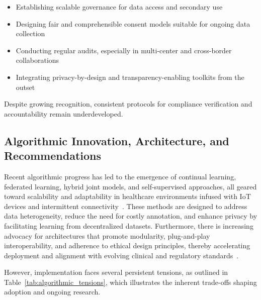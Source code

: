 \documentclass[sigconf]{acmart}
\begin{document}
\begin{itemize}
    \item Establishing scalable governance for data access and secondary use
    \item Designing fair and comprehensible consent models suitable for ongoing data collection
    \item Conducting regular audits, especially in multi-center and cross-border collaborations
    \item Integrating privacy-by-design and transparency-enabling toolkits from the outset
\end{itemize}

Despite growing recognition, consistent protocols for compliance verification and accountability remain underdeveloped.

\subsection{Algorithmic Innovation, Architecture, and Recommendations}

Recent algorithmic progress has led to the emergence of continual learning, federated learning, hybrid joint models, and self-supervised approaches, all geared toward scalability and adaptability in healthcare environments infused with IoT devices and intermittent connectivity~\cite{ref36, ref37, ref42, ref43, ref46, ref50, ref54, ref61, ref65, ref70, ref71, ref72, ref74, ref75, ref76, ref77, ref78, ref79, ref90, ref104, ref105, ref107}. These methods are designed to address data heterogeneity, reduce the need for costly annotation, and enhance privacy by facilitating learning from decentralized datasets. Furthermore, there is increasing advocacy for architectures that promote modularity, plug-and-play interoperability, and adherence to ethical design principles, thereby accelerating deployment and alignment with evolving clinical and regulatory standards~\cite{ref7, ref11, ref12, ref13, ref14, ref16, ref17, ref18, ref19, ref20, ref21, ref22, ref23, ref24, ref25, ref28, ref30, ref32, ref33, ref34, ref35, ref41, ref43, ref44, ref45, ref46, ref49, ref50, ref60, ref61, ref62, ref63, ref64, ref65, ref70, ref71, ref72, ref73, ref74, ref75, ref76, ref77, ref78, ref79, ref80, ref84, ref106, ref107}.

However, implementation faces several persistent tensions, as outlined in Table~\ref{tab:algorithmic_tensions}, which illustrates the inherent trade-offs shaping adoption and ongoing research.
\end{document}
